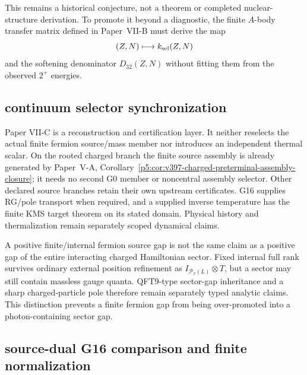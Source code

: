 \documentclass[12pt,a4paper]{article}
\begin{document}
This remains a historical conjecture, not a theorem or completed nuclear-structure derivation.  To promote it beyond a diagnostic, the finite \(A\)-body transfer matrix defined in Paper~VII-B must derive the map
\[
        (Z,N)\longmapsto k_{\rm sel}(Z,N)
\]
and the softening denominator \(D_{32}(Z,N)\) without fitting them from the observed \(2^+\) energies.




\subsection{continuum selector synchronization}
\label{p12:sec:v286-safeguard-continuum-selector-sync}
Paper VII-C is a reconstruction and certification layer.  It neither reselects
the actual finite fermion source/mass member nor introduces an independent
thermal scalar.  On the rooted charged branch the finite source assembly is
already generated by Paper~V-A,
Corollary~\ref{p5:cor:v397-charged-preterminal-assembly-closure};
it needs no second G0 member or noncentral assembly selector.  Other declared
source branches retain their own upstream certificates.  G16 supplies
RG/pole transport when required, and a supplied inverse
temperature has the finite KMS target theorem on its stated domain.  Physical
history and thermalization remain separately scoped dynamical claims.


\begin{remark}
\label{p12:rem:v287-finite-source-versus-sector-gap}
A positive finite/internal fermion source gap is not the same claim as a
positive gap of the entire interacting charged Hamiltonian sector.  Fixed
internal full rank survives ordinary external position refinement as
$I_{\mathcal P_x(L)}\otimes T$, but a sector may still contain massless gauge
quanta.  QFT9-type sector-gap inheritance and a sharp charged-particle pole
therefore remain separately typed analytic claims.  This distinction prevents
a finite fermion gap from being over-promoted into a photon-containing sector
gap.
\end{remark}



\subsection{source-dual G16 comparison and finite normalization}
\label{p12:sec:v288-source-dual-g16}
\end{document}
